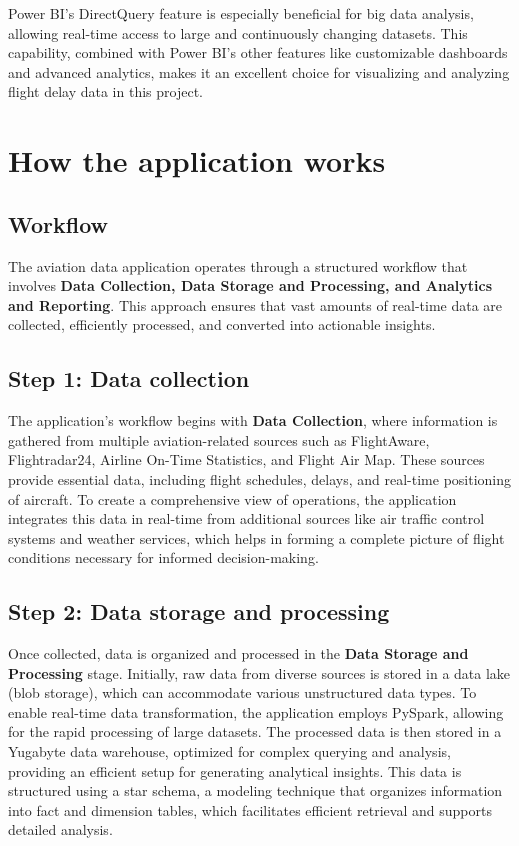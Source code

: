 \documentclass[12pt,a4paper]{article}
\begin{document}
Power BI’s DirectQuery feature is especially beneficial for big data analysis, allowing real-time access to large and continuously changing datasets. This capability, combined with Power BI’s other features like customizable dashboards and advanced analytics, makes it an excellent choice for visualizing and analyzing flight delay data in this project.
\section{How the application works}
\subsection{Workflow}
The aviation data application operates through a structured workflow that
involves \textbf{Data Collection, Data Storage and Processing, and Analytics and
Reporting}. This approach ensures that vast amounts of real-time data are
collected, efficiently processed, and converted into actionable insights.

\subsection*{Step 1: Data collection}
The application’s workflow begins with \textbf{Data Collection}, where
information is gathered from multiple aviation-related sources such as
FlightAware, Flightradar24, Airline On-Time Statistics, and Flight Air Map.
These sources provide essential data, including flight schedules, delays, and
real-time positioning of aircraft. To create a comprehensive view of operations,
the application integrates this data in real-time from additional sources like
air traffic control systems and weather services, which helps in forming a
complete picture of flight conditions necessary for informed decision-making.

\subsection*{Step 2: Data storage and processing}
Once collected, data is organized and processed in the \textbf{Data Storage and
Processing} stage. Initially, raw data from diverse sources is stored in a data
lake (blob storage), which can accommodate various unstructured data types. To
enable real-time data transformation, the application employs PySpark, allowing
for the rapid processing of large datasets. The processed data is then stored in
a Yugabyte data warehouse, optimized for complex querying and analysis,
providing an efficient setup for generating analytical insights. This data is
structured using a star schema, a modeling technique that organizes information
into fact and dimension tables, which facilitates efficient retrieval and
supports detailed analysis.
\end{document}
